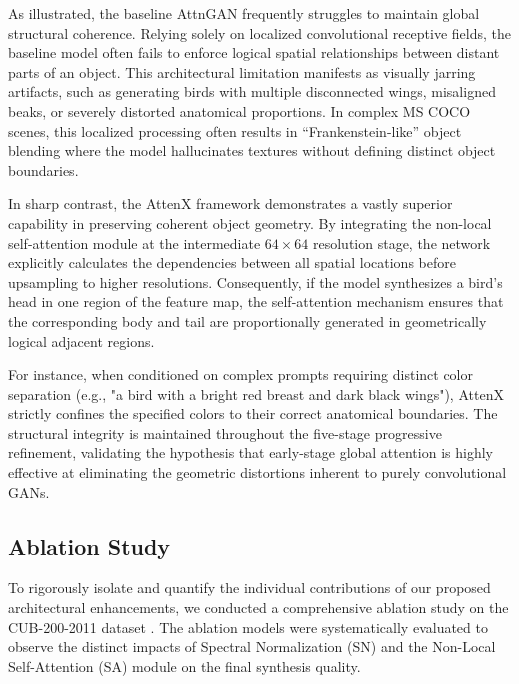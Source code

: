 \documentclass[conference]{IEEEtran}
\begin{document}
As illustrated, the baseline AttnGAN \cite{xu2018attngan} frequently struggles to maintain global structural coherence. Relying solely on localized convolutional receptive fields, the baseline model often fails to enforce logical spatial relationships between distant parts of an object. This architectural limitation manifests as visually jarring artifacts, such as generating birds with multiple disconnected wings, misaligned beaks, or severely distorted anatomical proportions. In complex MS COCO scenes, this localized processing often results in ``Frankenstein-like'' object blending where the model hallucinates textures without defining distinct object boundaries.

In sharp contrast, the AttenX framework demonstrates a vastly superior capability in preserving coherent object geometry. By integrating the non-local self-attention module \cite{wang2018nonlocal, zhang2019selfattention} at the intermediate $64 \times 64$ resolution stage, the network explicitly calculates the dependencies between all spatial locations before upsampling to higher resolutions. Consequently, if the model synthesizes a bird's head in one region of the feature map, the self-attention mechanism ensures that the corresponding body and tail are proportionally generated in geometrically logical adjacent regions.

For instance, when conditioned on complex prompts requiring distinct color separation (e.g., "a bird with a bright red breast and dark black wings"), AttenX strictly confines the specified colors to their correct anatomical boundaries. The structural integrity is maintained throughout the five-stage progressive refinement, validating the hypothesis that early-stage global attention \cite{wang2018nonlocal} is highly effective at eliminating the geometric distortions inherent to purely convolutional GANs.

\subsection{Ablation Study}

To rigorously isolate and quantify the individual contributions of our proposed architectural enhancements, we conducted a comprehensive ablation study on the CUB-200-2011 dataset \cite{wah2011caltech}. The ablation models were systematically evaluated to observe the distinct impacts of Spectral Normalization (SN) \cite{miyato2018spectral} and the Non-Local Self-Attention (SA) module \cite{wang2018nonlocal, zhang2019selfattention} on the final synthesis quality.
\end{document}
